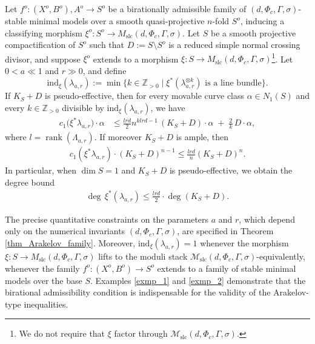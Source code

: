\documentclass[11pt,letterpaper]{amsart}
\numberwithin{equation}{section}
\begin{document}
	\begin{thm}\label{thm_main_numbound_moduli}
		Let $f^o \colon (X^o, B^o), A^o \to S^o$ be a birationally admissible family of $(d,\Phi_c,\Gamma,\sigma)$-stable minimal models over a smooth quasi-projective $n$-fold $S^o$, inducing a classifying morphism $\xi^o \colon S^o \to M_{\mathrm{slc}}(d,\Phi_c,\Gamma,\sigma)$. Let $S$ be a smooth projective compactification of $S^o$ such that $D := S \setminus S^o$ is a reduced simple normal crossing divisor, and suppose $\xi^o$ extends to a morphism $\xi \colon S \to M_{\mathrm{slc}}(d,\Phi_c,\Gamma,\sigma)$\footnote{We do not require that $\xi$ factor through $\mathcal{M}_{\mathrm{slc}}(d,\Phi_c,\Gamma,\sigma)$.}. Let $0<a\ll1$ and $r\gg0$, and define  
		\[
		\mathrm{ind}_\xi(\lambda_{a,r}) := \min\big\{k \in \mathbb{Z}_{>0} \mid \xi^*(\lambda_{a,r}^{\otimes k}) \text{ is a line bundle}\big\}.
		\]  
		If $K_S + D$ is pseudo-effective, then for every movable curve class $\alpha \in N_1(S)$ and every $k \in \mathbb{Z}_{>0}$ divisible by $\mathrm{ind}_\xi(\lambda_{a,r})$, we have  
		\begin{align}\label{align_main_Arakelov_inequality}
			c_1\big(\xi^*\lambda_{a,r}\big) \cdot \alpha 
			&\leq \frac{lrd}{2}n^{klrd-1} \, (K_S + D) \cdot \alpha \;+\; \frac{2}{k}\, D \cdot \alpha,
		\end{align}
		where $l = \operatorname{rank}(\Lambda_{a,r})$.  
		If moreover $K_S+D$ is ample, then  
		\begin{align*}
			c_1(\xi^*\lambda_{a,r})\cdot(K_S+D)^{n-1} \leq \frac{lrd}{n}(K_S+D)^{n}.
		\end{align*}		
		In particular, when $\dim S = 1$ and $K_S+D$ is pseudo-effective, we obtain the degree bound  
		\begin{align}\label{align_main_Arakelov_inequlaity_dim1}
		\deg\, \xi^*(\lambda_{a,r}) \leq \frac{lrd}{2} \cdot \deg(K_S + D).
	    \end{align}
	\end{thm}
    The precise quantitative constraints on the parameters $a$ and $r$, which depend only on the numerical invariants $(d,\Phi_c,\Gamma,\sigma)$, are specified in Theorem \ref{thm_Arakelov_family}. Moreover, $\mathrm{ind}_\xi(\lambda_{a,r}) = 1$ whenever the morphism $\xi \colon S \to M_{\mathrm{slc}}(d,\Phi_c,\Gamma,\sigma)$ lifts to the moduli stack $\mathcal{M}_{\mathrm{slc}}(d,\Phi_c,\Gamma,\sigma)$-equivalently, whenever the family $f^o :(X^o,B^o) \to S^o$ extends to a family of stable minimal models over the base $S$.
    Examples \ref{exmp_1} and \ref{exmp_2} demonstrate that the birational admissibility condition is indispensable for the validity of the Arakelov-type inequalities.
    
\end{document}
